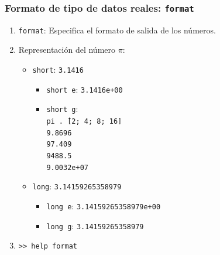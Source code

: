 \begin{frame}[label=tipo_reales]
 \frametitle{Formato de tipo de datos reales: \texttt{format}}
 \begin{enumerate}
  \item \texttt{format}: Especifica el formato de salida de los números.
  \item Representación del número $\pi$:
  \begin{itemize}
    \item \alert{\texttt{short}}: \texttt{3.1416}
    \begin{itemize}
     \item \texttt{short e}: \texttt{3.1416e+00}
     \item \alert{\texttt{short g}}: \\ \texttt{pi .\^\ [2; 4; 8; 16]\\
        9.8696\\97.409\\9488.5\\9.0032e+07}
    \end{itemize}
    \item \alert{\texttt{long}}: \texttt{3.14159265358979}
    \begin{itemize}
     \item \texttt{long e}: \texttt{3.14159265358979e+00}
     \item \alert{\texttt{long g}}: \texttt{3.14159265358979}                          
    \end{itemize}
  \end{itemize}
  \item \alert{\texttt{>> help format}}
 \end{enumerate}
\end{frame}
